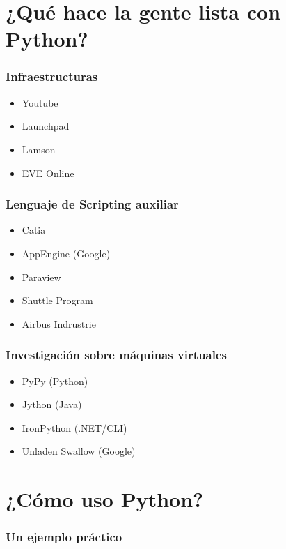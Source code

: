 \documentclass[12pt,mathserif,compress]{beamer}
\begin{document}
\section{¿Qué hace la gente lista con Python?}

\begin{frame}
  \frametitle{Infraestructuras}
  \begin{itemize}
  \item Youtube
  \item Launchpad 
  \item Lamson
  \item EVE Online
  \end{itemize}
\end{frame}

\begin{frame}
  \frametitle{Lenguaje de Scripting auxiliar}
  \begin{itemize}
  \item Catia
  \item AppEngine (Google)
  \item Paraview
  \item Shuttle Program
  \item Airbus Indrustrie
  \end{itemize}
\end{frame}

\begin{frame}
  \frametitle{Investigación sobre máquinas virtuales}
  \begin{itemize}
  \item PyPy (Python)
  \item Jython (Java)
  \item IronPython (.NET/CLI)
  \item Unladen Swallow (Google)
  \end{itemize}
\end{frame}

\section{¿Cómo uso Python?}

\begin{frame}
  \frametitle{Un ejemplo práctico}
\end{frame}



\end{document}
